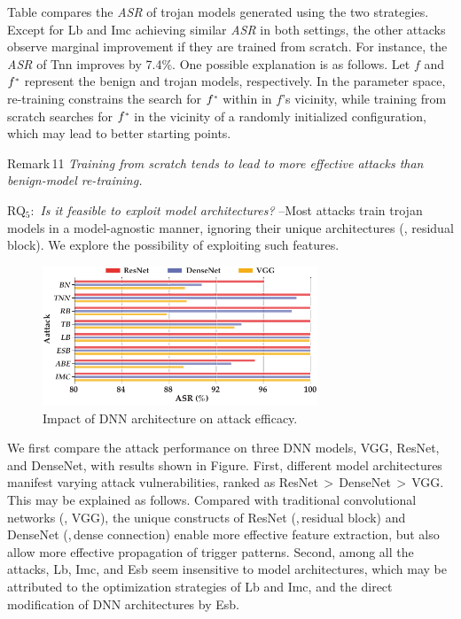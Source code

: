 \documentclass[compsoc,conference,a4paper,10pt,times]{IEEEtran}
\newcommand{\tnn}{{\sc Tnn}\xspace}
\newcommand{\lb}{{\sc Lb}\xspace}
\newcommand{\esb}{{\sc Esb}\xspace}
\newcommand{\imc}{{\sc Imc}\xspace}
\newcommand{\asr}{{\em \small ASR}\xspace}
\begin{document}
Table compares the \asr of trojan models generated using the two strategies. Except for \lb and \imc achieving similar \asr in both settings, the other attacks observe marginal improvement if they are trained from scratch. For instance, the \asr of \tnn improves by 7.4\%. One possible explanation is as follows. Let $f$ and $\uf$ represent the benign and trojan models, respectively. In the parameter space, re-training constrains the search for $\uf$ within in $f$'s vicinity, while training from scratch searches for $\uf$ in the vicinity of a randomly initialized configuration, which may lead to better starting points. 
\begin{mtbox}{\small Remark\,11}
    {\em \small Training from scratch tends to lead to more effective attacks than benign-model re-training.}
\end{mtbox}
    
\vspace{2pt}
{RQ$_5$:\, {\em Is it feasible to exploit model architectures?}} --Most attacks train trojan models in a model-agnostic manner, ignoring their unique architectures (\meg, residual block). We explore the possibility of exploiting such features. 

\begin{figure}[!ht]
    \centering
    \includegraphics[width=82mm]{figures/model-arch-bar.pdf}
    \caption{Impact of DNN architecture on attack efficacy. \label{fig:model_arch}}
\end{figure}

We first compare the attack performance on three DNN models, VGG, ResNet, and DenseNet, with results shown in Figure. First, different model architectures manifest varying attack vulnerabilities, ranked as ResNet\,$>$\,DenseNet\,$>$\,VGG. This may be explained as follows. Compared with traditional convolutional networks (\meg, VGG), the unique constructs of ResNet (\mie,\,residual block) and DenseNet (\mie,\,dense connection) enable more effective feature extraction, but also allow more effective propagation of trigger patterns. Second, among all the attacks, \lb, \imc, and \esb seem insensitive to model architectures, which may be attributed to the optimization strategies of \lb and \imc, and the direct modification of DNN architectures by \esb.
\end{document}
